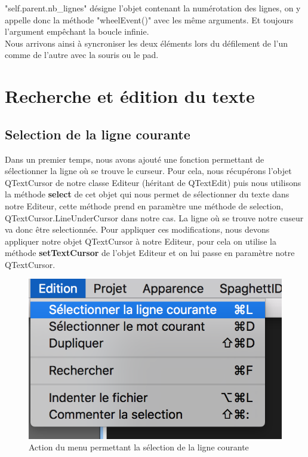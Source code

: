 \documentclass[a4paper,12pt]{article}
\begin{document}
		"self.parent.nb\_lignes" désigne l'objet contenant la numérotation des lignes, on y appelle donc la méthode "wheelEvent()" avec les même arguments. Et toujours l'argument empêchant la boucle infinie.\\
		
		Nous arrivons ainsi à syncroniser les deux éléments lors du défilement de l'un comme de l'autre avec la souris ou le pad.
		
		
\section{Recherche et édition du texte}

	\subsection{Selection de la ligne courante}

	Dans un premier temps, nous avons ajouté une fonction permettant de sélectionner la ligne où se trouve le curseur.
	Pour cela, nous récupérons l'objet QTextCursor de notre classe Editeur (héritant de QTextEdit) puis nous utilisons la méthode \textbf{select} de cet objet qui nous permet de sélectionner du texte dans notre Editeur, cette méthode prend en paramètre une méthode de selection, QTextCursor.LineUnderCursor dans notre cas. La ligne où se trouve notre cuseur va donc être selectionnée.
	Pour appliquer ces modifications, nous devons appliquer notre objet QTextCursor à notre Editeur, pour cela on utilise la méthode \textbf{setTextCursor} de l'objet Editeur et on lui passe en paramètre notre QTextCursor.  


	\begin{figure}[h!]
		\begin{center}
			\includegraphics[scale=0.8]{images/imgs_edit/utilisation_selection_ligne}
			\caption{Action du menu permettant la sélection de la ligne courante}
		\end{center}
	\end{figure}
\end{document}
